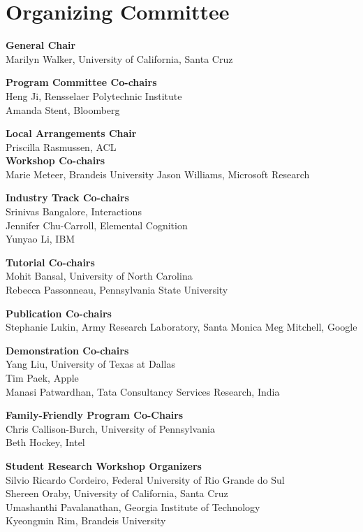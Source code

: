 \markboth{}{} %
\markright{}{} %

\section{Organizing Committee}{}\vspace{2em}

\setlength{\parindent}{0pt}

{\bf General Chair} \\
Marilyn Walker, University of California, Santa Cruz

{\bf Program Committee Co-chairs} \\
Heng Ji, Rensselaer Polytechnic Institute\\
Amanda Stent, Bloomberg

{\bf Local Arrangements Chair} \\
Priscilla Rasmussen, ACL\\


{\bf Workshop Co-chairs} \\
Marie Meteer, Brandeis University
Jason Williams, Microsoft Research

{\bf Industry Track Co-chairs} \\
Srinivas Bangalore, Interactions \\
Jennifer Chu-Carroll, Elemental Cognition \\
Yunyao Li, IBM

{\bf Tutorial Co-chairs} \\
Mohit Bansal, University of North Carolina\\
Rebecca Passonneau, Pennsylvania State University

{\bf Publication Co-chairs} \\
Stephanie Lukin, Army Research Laboratory, Santa Monica
Meg Mitchell, Google

{\bf Demonstration Co-chairs} \\
Yang Liu, University of Texas at Dallas\\
Tim Paek, Apple\\
Manasi Patwardhan, Tata Consultancy Services Research, India

{\bf Family-Friendly Program Co-Chairs} \\
Chris Callison-Burch, University of Pennsylvania\\
Beth Hockey, Intel

{\bf Student Research Workshop Organizers} \\
Silvio Ricardo Cordeiro, Federal University of Rio Grande do Sul \\
Shereen Oraby, University of California, Santa Cruz \\
Umashanthi Pavalanathan, Georgia Institute of Technology\\
Kyeongmin Rim, Brandeis University \\


